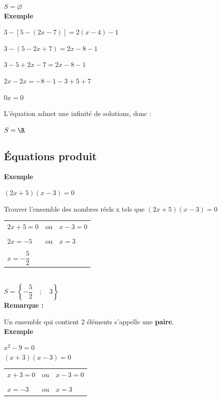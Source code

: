 $ S = \varnothing $ \\

\textbf{Exemple }

$ 3 - \left[5-\left(2x-7\right)\right] = 2\left(x-4\right)-1 $

$ 3 - \left(5-2x+7\right) = 2x - 8 - 1 $ 

$ 3 - 5 + 2x - 7 = 2x - 8 -1 $

$ 2x - 2x = -8 -1 -3 + 5 + 7 $

$ 0x = 0 $ 

L'équation admet une infinité de solutions, donc :

$ S = \R $ 

\subsection{Équations produit}

\textbf{Exemple }

\vspace{.1cm}

$ \left(2x+5\right)\left(x-3\right)=0 $

Trouver l'ensemble des nombres réels x tels que $\left(2x+5\right)\left(x-3\right)=0 $ \\

\begin{tabular}{lcl}
$ 2x + 5 = 0 $ &  ou   & $ x-3 = 0 $ \\
&&\\
$ 2x = -5 $ & ou & $ x=3 $\\ 
&&\\
$x = -\dfrac{5}{2} $ &&\\
\end{tabular}\\

$ S = \left\lbrace -\dfrac{5}{2} \quad ; \quad 3 \right\rbrace $ \\

\textbf{Remarque :}

Un ensemble qui contient 2 éléments s'appelle une \textbf{paire}. \\

\textbf{Exemple }

$ x^2 - 9 = 0 $\\

$\left(x+3\right)\left(x-3\right) = 0 $\\

\begin{tabular}{lcl}
$ x+3 = 0 $ & ou &$ x-3 = 0 $\\
&&\\
$ x = -3 $ &ou& $ x =3 $ \\
\end{tabular}\\

